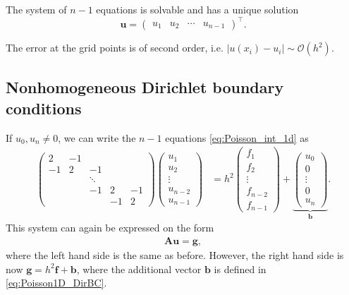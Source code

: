 The system of $n-1$ equations is solvable and has a unique solution
\[
  \bm u = \begin{pmatrix} u_1 & u_2 & \cdots & u_{n-1} \end{pmatrix}^\intercal.
\]

The error at the grid points is of second order, i.e.
$|u(x_i)-u_i| \sim \mathcal{O}(h^2)$.

\subsection{Nonhomogeneous Dirichlet boundary conditions}

If $u_0, u_{n} \not= 0$, we can write the $n-1$ equations
\eqref{eq:Poisson_int_1d} as
\begin{align}
  \begin{pmatrix}
    2 & -1 & & & \\
    -1 & 2 & -1 & & \\
    & & \ddots & & \\
    & & -1 & 2 & -1 \\
    & & & -1 & 2
  \end{pmatrix}
  \begin{pmatrix}
    u_1 \\
    u_2 \\
    \vdots \\
    u_{n-2} \\
    u_{n-1}
  \end{pmatrix}
  &= h^2
  \begin{pmatrix}
    f_1 \\
    f_2 \\
    \vdots \\
    f_{n-2} \\
    f_{n-1}
  \end{pmatrix}
  +
  \underbrace{ \begin{pmatrix}
    u_0 \\
    0 \\
    \vdots \\
    0 \\
    u_{n}
  \end{pmatrix}
  }_{\bm b}.
  \label{eq:Poisson1D_DirBC}
\end{align}
This system can again be expressed on the form
\begin{align*}
  \bm A \bm u = \bm g,
\end{align*}
where the left hand side is the same as before. However, the right hand side is
now $\bm g = h^2 \bm f + \bm b$, where the additional vector $\bm b$ is defined
in \eqref{eq:Poisson1D_DirBC}.

